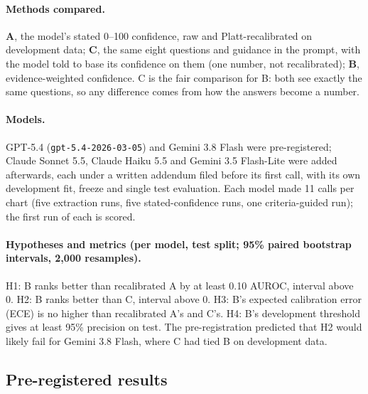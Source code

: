 \documentclass[10pt,letterpaper]{article}
\begin{document}
\paragraph{Methods compared.}
\textbf{A}, the model's stated 0--100 confidence, raw and Platt-recalibrated on development data;
\textbf{C}, the same eight questions and guidance in the prompt, with the model told to base its confidence on them (one number, not recalibrated);
\textbf{B}, evidence-weighted confidence.
C is the fair comparison for B: both see exactly the same questions, so any difference comes from how the answers become a number.

\paragraph{Models.} GPT-5.4 (\texttt{gpt-5.4-2026-03-05}) and Gemini 3.8 Flash were pre-registered; Claude Sonnet 5.5, Claude Haiku 5.5 and Gemini 3.5 Flash-Lite were added afterwards, each under a written addendum filed before its first call, with its own development fit, freeze and single test evaluation. Each model made 11 calls per chart (five extraction runs, five stated-confidence runs, one criteria-guided run); the first run of each is scored.

\paragraph{Hypotheses and metrics (per model, test split; 95\% paired bootstrap intervals, 2,000 resamples).}
H1: B ranks better than recalibrated A by at least 0.10 AUROC, interval above 0.
H2: B ranks better than C, interval above 0.
H3: B's expected calibration error (ECE) is no higher than recalibrated A's and C's.
H4: B's development threshold gives at least 95\% precision on test.
The pre-registration predicted that H2 would likely fail for Gemini 3.8 Flash, where C had tied B on development data.

\subsection{Pre-registered results}
\end{document}
